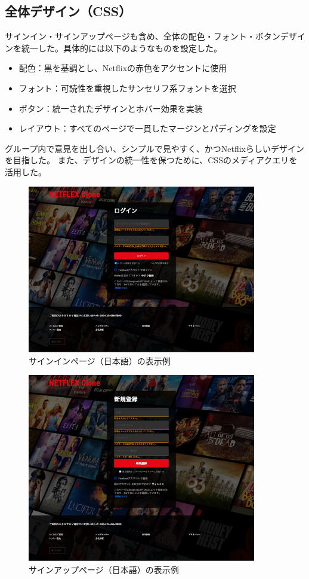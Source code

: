 \documentclass[12pt,a4j]{jarticle}
\begin{document}
\subsection{全体デザイン（CSS）}
サインイン・サインアップページも含め、全体の配色・フォント・ボタンデザインを統一した。具体的には以下のようなものを設定した。
\begin{itemize}
\item 配色：黒を基調とし、Netflixの赤色をアクセントに使用
\item フォント：可読性を重視したサンセリフ系フォントを選択
\item ボタン：統一されたデザインとホバー効果を実装
\item レイアウト：すべてのページで一貫したマージンとパディングを設定
\end{itemize}

グループ内で意見を出し合い、シンプルで見やすく、かつNetflixらしいデザインを目指した。
また、デザインの統一性を保つために、CSSのメディアクエリを活用した。

\begin{figure}[htbp]
\begin{center}
\includegraphics[width=10cm]{login.png}
\caption{サインインページ（日本語）の表示例}\label{fig3}
\end{center}
\end{figure}

\begin{figure}[htbp]
\begin{center}
\includegraphics[width=10cm]{sign_up.png}
\caption{サインアップページ（日本語）の表示例}\label{fig4}
\end{center}
\end{figure}
\end{document}
